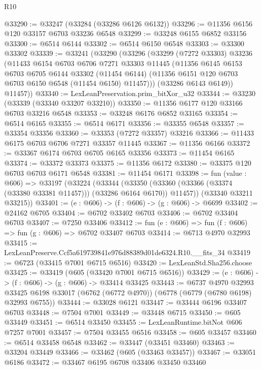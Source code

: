 \begin{lexlean}{R10}
\begin{coremodule}
@33290 := @33247 (@33284 (@33286 @6126 @6132))
@33296 := @11356 @6156 @120 @33157 @6703 @33236 @6548
@33299 := @33248 @6155 @6852 @33156
@33300 := @6514 @6144
@33302 := @6514 @6150 @6548
@33303 := @33300 @33302
@33339 := @33241
    (@33290
      (@33296
        (@33299
          (@7272 @33303)
          @33236
          (@11433
            @6154
            @6703
            @6706
            @7271
            @33303
            @11445
            (@11356
              @6145
              @6153
              @6703
              @6705
              @6144
              @33302
              (@11454 @6144)
              (@11356 @6151 @120 @6703 @6703 @6150 @6548 (@11454 @6150) @11457)))
          (@33286 @6143 @6149))
        @11457))
@33340 := LexLeanPreservation.prim_bitXor_u32
@33344 := @33230 (@33339 (@33340 @33207 @33210))
@33350 := @11356 @6177 @120 @33166 @6703 @33216 @6548
@33353 := @33248 @6176 @6852 @33165
@33354 := @6514 @6165
@33355 := @6514 @6171
@33356 := @33355 @6548
@33357 := @33354 @33356
@33360 := @33353 (@7272 @33357) @33216
@33366 := @11433 @6175 @6703 @6706 @7271 @33357 @11445
@33367 := @11356 @6166
@33372 := @33367 @6174 @6703 @6705 @6165 @33356
@33373 := @11454 @6165
@33374 := @33372 @33373
@33375 := @11356 @6172
@33380 := @33375 @120 @6703 @6703 @6171 @6548
@33381 := @11454 @6171
@33398 := fun (value : @606) =>
  @33197
    (@33224
      (@33344
        (@33350 (@33360 (@33366 (@33374 (@33380 @33381 @11457))) (@33286 @6164 @6170)) @11457))
      (@33340 @33211 @33215))
@33401 := (e : @606) -> (f : @606) -> (g : @606) -> @6699
@33402 := @24162 @6705
@33404 := @6702 @33402 @6703
@33406 := @6702 @33404 @6703
@33407 := @7250 @33406
@33412 := fun (e : @606) => fun (f : @606) => fun (g : @606) => @6702 @33407 @6703
@33414 := @6713 @4970 @32993
@33415 := LexLeanPreserve.Ccf5a619739841e976d88389d01de6324.R10.__fits_34
@33419 := @6723 (@33415 @7001 @6715 @6516)
@33420 := LexLeanStd.Sha256.choose
@33425 := @33419 (@605 (@33420 @7001 @6715 @6516))
@33429 := (e : @606) -> (f : @606) -> (g : @606) -> @33414 @33425
@33443 := @6737
    @4970
    @32993
    @33425
    @6198
    @33017
    (@6762 (@6772 @4970))
    (@6778 (@6779 (@6780 @6198) @32993 @6755))
@33444 := @33028 @6121
@33447 := @33444 @6196 @33407 @6703
@33448 := @7504 @7001
@33449 := @33448 @6715
@33450 := @605 @33449
@33451 := @6514 @33450
@33455 := LexLeanRuntime.bitNot @606 @7257 @7001
@33457 := @7504 @33455 @6516
@33458 := @605 @33457
@33460 := @6514 @33458 @6548
@33462 := @33447 (@33451 @33460)
@33463 := @33204 @33449
@33466 := @33462 (@605 (@33463 @33457))
@33467 := @33051 @6186
@33472 := @33467 @6195 @6708 @33406 @33450 @33460

\end{coremodule}
\end{lexlean}
